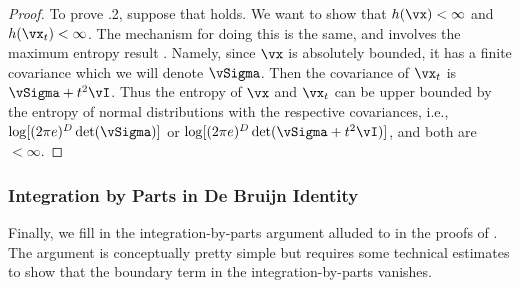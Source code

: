 \documentclass[../../book-main.tex]{subfiles}
\begin{document}
\begin{proof}
    To prove .2, suppose that
     holds. We want to
    show that \(h(\vx) < \infty\) and \(h(\vx_{t}) < \infty\). The
    mechanism for doing this is the same, and involves the maximum
    entropy result . Namely, since \(\vx\) is
    absolutely bounded, it has a finite covariance which we will
    denote \(\vSigma\). Then the covariance of \(\vx_{t}\) is
    \(\vSigma + t^{2}\vI\). Thus the entropy of \(\vx\) and
    \(\vx_{t}\) can be upper bounded by the entropy of normal
    distributions with the respective covariances, i.e., \(\log[(2\pi
    e)^{D}\det(\vSigma)]\) or \(\log[(2\pi e)^{D}\det(\vSigma +
    t^{2}\vI)]\), and both are \(< \infty\).
\end{proof}

\subsubsection{Integration by Parts in De Bruijn Identity}

Finally, we fill in the integration-by-parts argument alluded to in
the proofs of
.
The argument is conceptually pretty simple but requires some
technical estimates to show that the boundary term in the
integration-by-parts vanishes.
\end{document}
